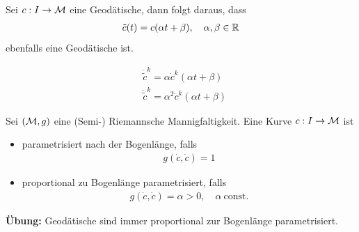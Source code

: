 \begin{lem}
\label{lem:geolinear}
Sei $c: I \to \mathcal{M}$ eine Geodätische, dann folgt daraus, dass 
\begin{align*}
\tilde{c}(t) = c(\alpha t + \beta), \quad \alpha, \beta \in \mathbb{R}
\end{align*}
ebenfalls eine Geodätische ist.
\end{lem}
\begin{bew}
\begin{align*}
&\dot{\tilde{c}}^k = \alpha \dot{c}^k (\alpha t + \beta)\\
& \ddot{\tilde{c}}^k = \alpha^2 \ddot{c}^k (\alpha t + \beta)
\end{align*}
\end{bew}
\begin{defs}
Sei $(\mathcal{M}, g)$ eine (Semi-) Riemannsche Mannigfaltigkeit.
Eine Kurve $c: I \to \mathcal{M}$ ist
\begin{itemize}
\item parametrisiert nach der Bogenlänge, falls
\begin{align}
g(\dot{c}, \dot{c}) = 1
\end{align}
\item proportional zu Bogenlänge parametrisiert, falls
\begin{align}
g(\dot{c}, \dot{c}) = \alpha > 0, \quad \alpha \ \mathrm{const.}
\end{align}
\end{itemize}
\end{defs}
\textbf{Übung:} Geodätische sind immer proportional zur Bogenlänge parametrisiert.\\

